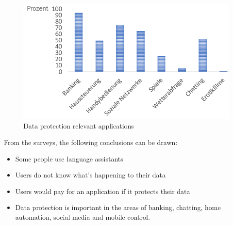 \begin{figure}[h]
	\centering
	\includegraphics[width=0.9\linewidth]{Picture/umfrage_anwendung}
	\caption[Data protection relevant applications]{Data protection relevant applications}
	\label{fig:umfrage_anwendung}
\end{figure}

From the surveys, the following conclusions can be drawn:
\begin{itemize}	
	\item Some people use language assistants
	\item Users do not know what's happening to their data
	\item Users would pay for an application if it protects their data
	\item Data protection is important in the areas of banking, chatting, home automation, social media and mobile control.
\end{itemize}
